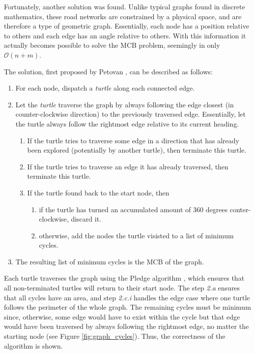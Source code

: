 Fortunately, another solution was found.
Unlike typical graphs found in discrete mathematics, these road networks are constrained by a physical space, and are therefore a type of geometric graph.
Essentially, each node has a position relative to others and each edge has an angle relative to others.
With this information it actually becomes possible to solve the MCB problem, seemingly in only $\mathcal{O}(n + m)$.

The solution, first proposed by Petovan \cite{petovan}, can be described as follows:
\vspace{-0.5cm} %
\begin{enumerate}
  \item For each node, dispatch a \textit{turtle} along each connected edge.
  \item Let the \textit{turtle} traverse the graph by always following the edge closest (in counter-clockwise direction) to the previously traversed edge. Essentially, let the turtle always follow the rightmost edge relative to its current heading.
  \begin{enumerate}
    \item If the turtle tries to traverse some edge in a direction that has already been explored (potentially by another turtle), then terminate this turtle.
    \item If the turtle tries to traverse an edge it has already traversed, then terminate this turtle.
    \item If the turtle found back to the start node, then
      \begin{enumerate}
        \item if the turtle has turned an accumulated amount of 360 degrees conter-clockwise, discard it.
        \item otherwise, add the nodes the turtle visisted to a list of minimum cycles.
      \end{enumerate}
  \end{enumerate}
  \item The resulting list of minimum cycles is the MCB of the graph.
\end{enumerate}

Each turtle traverses the graph using the Pledge algorithm \cite{turtle_geometry}, which ensures that all non-terminated turtles will return to their start node.
The step \textit{2.a} ensures that all cycles have an area, and step \textit{2.c.i} handles the edge case where one turtle follows the perimeter of the whole graph.
The remaining cycles must be minimum since, otherwise, some edge would have to exist within the cycle but that edge would have been traversed by always following the rightmost edge, no matter the starting node (see Figure \ref{fig:graph_cycles}).
Thus, the correctness of the algorithm is shown.

